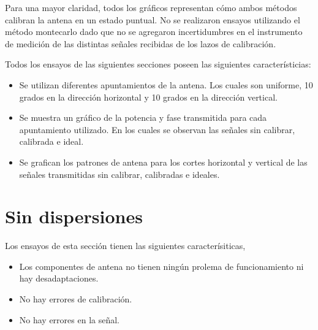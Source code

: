 Para una mayor claridad, todos los gráficos representan cómo ambos métodos calibran la antena en un estado puntual. No se 
realizaron ensayos utilizando el método montecarlo dado que no se agregaron incertidumbres en el instrumento de medición de las 
distintas señales recibidas de los lazos de calibración.

Todos los ensayos de las siguientes secciones poseen las siguientes característicias:
\begin{itemize}
	\item Se utilizan diferentes apuntamientos de la antena. Los cuales son uniforme, 10 grados en la dirección horizontal y 10 
		grados en la dirección vertical.
	\item Se muestra un gráfico de la potencia y fase transmitida para cada apuntamiento utilizado. En los cuales se observan las
		señales sin calibrar, calibrada e ideal. 
	\item Se grafican los patrones de antena para los cortes horizontal y vertical de las señales transmitidas sin calibrar, 
		calibradas e ideales.
\end{itemize}


\section{Sin dispersiones}

Los ensayos de esta sección tienen las siguientes caracterísiticas,
\begin{itemize}
	\item Los componentes de antena no tienen ningún prolema de funcionamiento ni hay desadaptaciones.
	\item No hay errores de calibración.
	\item No hay errores en la señal.
\end{itemize}

